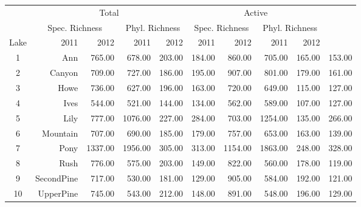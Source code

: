 \begin{table}[ht]
\centering
\begin{tabular}{c r r r r r r r r r }
  \hline
\hline
  & \multicolumn{4}{c}{Total} &
\multicolumn{4}{c}{Active} \\
 & \multicolumn{2}{c}{Spec. Richness} &
\multicolumn{2}{c}{Phyl. Richness} &
\multicolumn{2}{c}{Spec. Richness} &
\multicolumn{2}{c}{Phyl. Richness} \\
 Lake & 2011 & 2012 & 2011 & 2012 &
2011 & 2012 & 2011 & 2012 \\
 \hline
1 & Ann & 765.00 & 678.00 & 203.00 & 184.00 & 860.00 & 705.00 & 165.00 & 153.00 \\ 
  2 & Canyon & 709.00 & 727.00 & 186.00 & 195.00 & 907.00 & 801.00 & 179.00 & 161.00 \\ 
  3 & Howe & 736.00 & 627.00 & 196.00 & 163.00 & 720.00 & 649.00 & 115.00 & 127.00 \\ 
  4 & Ives & 544.00 & 521.00 & 144.00 & 134.00 & 562.00 & 589.00 & 107.00 & 127.00 \\ 
  5 & Lily & 777.00 & 1076.00 & 227.00 & 284.00 & 703.00 & 1254.00 & 135.00 & 266.00 \\ 
  6 & Mountain & 707.00 & 690.00 & 185.00 & 179.00 & 757.00 & 653.00 & 163.00 & 139.00 \\ 
  7 & Pony & 1337.00 & 1956.00 & 305.00 & 313.00 & 1154.00 & 1863.00 & 248.00 & 328.00 \\ 
  8 & Rush & 776.00 & 575.00 & 203.00 & 149.00 & 822.00 & 560.00 & 178.00 & 119.00 \\ 
  9 & SecondPine & 717.00 & 530.00 & 181.00 & 129.00 & 905.00 & 584.00 & 192.00 & 121.00 \\ 
  10 & UpperPine & 745.00 & 543.00 & 212.00 & 148.00 & 891.00 & 548.00 & 196.00 & 129.00 \\ 
   \hline
\end{tabular}
\end{table}
